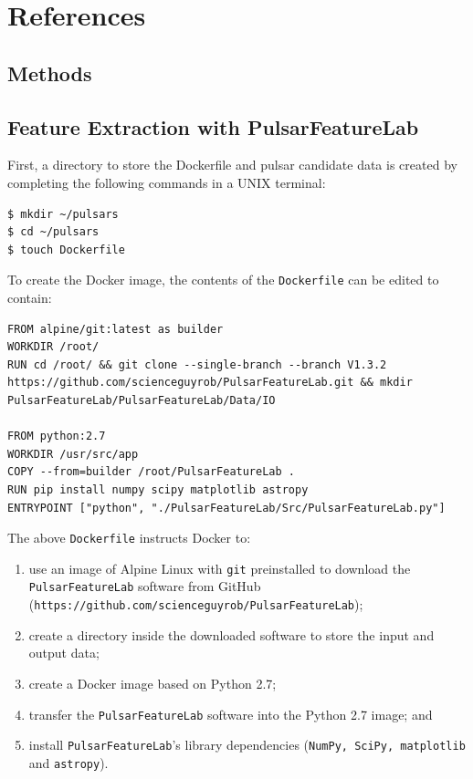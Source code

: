 \documentclass{article}
\begin{document}
\pagebreak
\section{References}
\printbibliography[heading=none]

\pagebreak
\begin{appendices}

    \section{Methods}
    \begin{subappendices}
        \subsection{Feature Extraction with PulsarFeatureLab}
        \label{apndx:pulsarfeaturelab}

        First, a directory to store the Dockerfile and pulsar candidate data is created by completing the following commands in a UNIX terminal:

        \begin{lstlisting}[numbers=none]
$ mkdir ~/pulsars
$ cd ~/pulsars
$ touch Dockerfile
        \end{lstlisting}

        To create the Docker image, the contents of the \verb|Dockerfile| can be edited to contain:

        \begin{lstlisting}[title=Dockerfile]
FROM alpine/git:latest as builder
WORKDIR /root/
RUN cd /root/ && git clone --single-branch --branch V1.3.2 https://github.com/scienceguyrob/PulsarFeatureLab.git && mkdir PulsarFeatureLab/PulsarFeatureLab/Data/IO

FROM python:2.7
WORKDIR /usr/src/app
COPY --from=builder /root/PulsarFeatureLab .
RUN pip install numpy scipy matplotlib astropy
ENTRYPOINT ["python", "./PulsarFeatureLab/Src/PulsarFeatureLab.py"]
        \end{lstlisting}

        The above \verb|Dockerfile| instructs Docker to:
        \begin{enumerate}[label=\roman*.]
            \item use an image of Alpine Linux with \verb|git| preinstalled to download the \verb|PulsarFeatureLab| software from GitHub \\(\verb|https://github.com/scienceguyrob/PulsarFeatureLab|);
            \item create a directory inside the downloaded software to store the input and output data;
            \item create a Docker image based on Python 2.7;
            \item transfer the \verb|PulsarFeatureLab| software into the Python 2.7 image; and
            \item install \verb|PulsarFeatureLab|'s library dependencies (\verb|NumPy, SciPy, matplotlib| and \verb|astropy|).
        \end{enumerate}


\end{subappendices}
\end{appendices}
\end{document}
